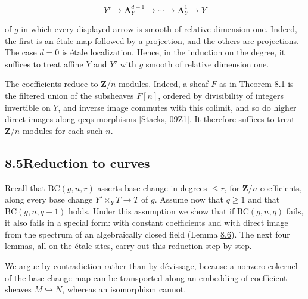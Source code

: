 \documentclass[11pt]{article}
\begin{document}
\[
Y'\longrightarrow\mathbf A^{d-1}_Y
\longrightarrow\cdots\longrightarrow\mathbf A^1_Y
\longrightarrow Y
\]

of \(g\) in which every displayed arrow is smooth of relative dimension one. Indeed, the first is an étale map followed by a projection, and the others are projections. The case \(d=0\) is étale localization. Hence, in the induction on the degree, it suffices to treat affine \(Y\) and \(Y'\) with \(g\) smooth of relative dimension one.

The coefficients reduce to \(\mathbf Z/n\)-modules. Indeed, a sheaf \(F\) as in Theorem \hyperref[bp7]{8.1} is the filtered union of the subsheaves \(F[n]\), ordered by divisibility of integers invertible on \(Y\), and inverse image commutes with this colimit, and so do higher direct images along qcqs morphisms [Stacks, \href{https://stacks.math.columbia.edu/tag/09Z1}{09Z1}]. It therefore suffices to treat \(\mathbf Z/n\)-modules for each such \(n\).


\subsection*{\texorpdfstring{8.5\quad Reduction to curves}{8.5 Reduction to curves}}
\label{bp15}%
\label{bp16}%
Recall that \(\mathrm{BC}(g,n,r)\) asserts base change in degrees \(\leq r\), for \(\mathbf Z/n\)-coefficients, along every base change \(Y'\times_YT\to T\) of \(g\). Assume now that \(q\geq1\) and that \(\mathrm{BC}(g,n,q-1)\) holds. Under this assumption we show that if \(\mathrm{BC}(g,n,q)\) fails, it also fails in a special form: with constant coefficients and with direct image from the spectrum of an algebraically closed field (Lemma \hyperref[bp26]{8.6}). The next four lemmas, all on the étale sites, carry out this reduction step by step.

We argue by contradiction rather than by dévissage, because a nonzero cokernel of the base change map can be transported along an embedding of coefficient sheaves \(M\hookrightarrow N\), whereas an isomorphism cannot.
\end{document}
